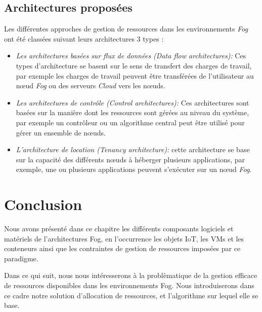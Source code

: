 \subsection{Architectures proposées}
 Les différentes approches de gestion de ressources dans les environnements \emph{Fog} ont été classées suivant leurs architectures 3 types \cite{ch2019} :
 \begin{itemize}
  \item \emph{Les architectures basées sur flux de données (Data flow architectures):} Ces types d'architecture se basent sur le sens de transfert des charges de travail, par exemple les charges de travail peuvent être transférées de l'utilisateur au nœud \emph{Fog} ou des serveurs \emph{Cloud} vers les nœuds.
  \item \emph{Les architectures de contrôle (Control architectures):} Ces architectures sont basées sur la manière dont les ressources sont gérées au niveau du système, par exemple un contrôleur ou un algorithme central peut être utilisé pour gérer un ensemble de nœuds.
  \item \emph{L'architecture de location (Tenancy architecture):} cette architecture se base sur la capacité des différents nœuds à héberger plusieurs applications,  par exemple, une ou plusieurs applications peuvent s'exécuter sur un nœud \emph{Fog}.
\end{itemize}

\section{Conclusion}
Nous avons présenté dans ce chapitre les différents composants logiciels et matériels de l'architectures Fog, en l'occurrence les objets IoT, les VMs et les conteneurs ainsi que les contraintes de gestion de ressources imposées par ce paradigme.\par
Dans ce qui suit, nous nous intéresserons à la problèmatique de la gestion efficace de ressources disponibles dans les environnements Fog. Nous introduiserons dans ce cadre notre solution d'allocation de ressources, et l'algorithme sur lequel elle se base.
